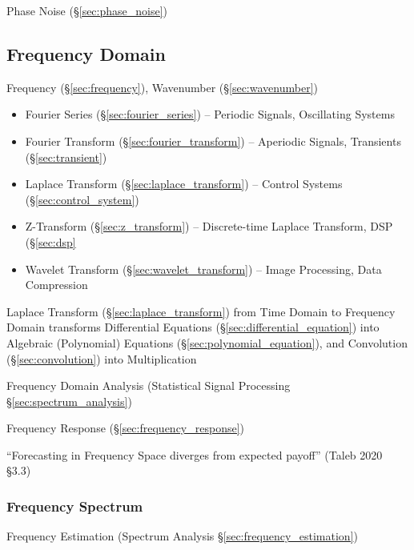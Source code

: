 Phase Noise (\S\ref{sec:phase_noise})



\subsection{Frequency Domain}\label{sec:frequency_domain}

Frequency (\S\ref{sec:frequency}), Wavenumber (\S\ref{sec:wavenumber})

\begin{itemize}
  \item Fourier Series (\S\ref{sec:fourier_series}) -- Periodic Signals,
    Oscillating Systems
  \item Fourier Transform (\S\ref{sec:fourier_transform}) -- Aperiodic Signals,
    Transients (\S\ref{sec:transient})
  \item Laplace Transform (\S\ref{sec:laplace_transform}) -- Control Systems
    (\S\ref{sec:control_system})
  \item Z-Transform (\S\ref{sec:z_transform}) -- Discrete-time Laplace
    Transform, DSP (\S\ref{sec:dsp}
  \item Wavelet Transform (\S\ref{sec:wavelet_transform}) -- Image Processing,
    Data Compression
\end{itemize}

Laplace Transform (\S\ref{sec:laplace_transform}) from Time Domain to Frequency
Domain transforms Differential Equations (\S\ref{sec:differential_equation})
into Algebraic (Polynomial) Equations (\S\ref{sec:polynomial_equation}), and
Convolution (\S\ref{sec:convolution}) into Multiplication

\fist Frequency Domain Analysis (Statistical Signal Processing
\S\ref{sec:spectrum_analysis})

\fist Frequency Response (\S\ref{sec:frequency_response})

``Forecasting in Frequency Space diverges from expected payoff''
(Taleb 2020 \S 3.3)



\subsubsection{Frequency Spectrum}\label{sec:frequency_spectrum}

\fist Frequency Estimation (Spectrum Analysis \S\ref{sec:frequency_estimation})

